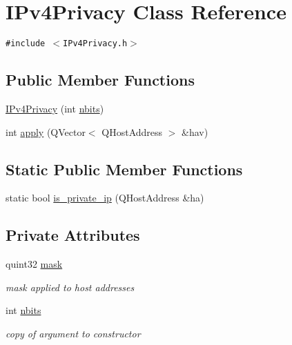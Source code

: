 \hypertarget{classIPv4Privacy}{
\section{IPv4Privacy Class Reference}
\label{classIPv4Privacy}
}
{\tt \#include $<$IPv4Privacy.h$>$}

\subsection*{Public Member Functions}
\begin{CompactItemize}
\item 
\hyperlink{classIPv4Privacy_1527628365ad50b068b9fa27159b7ce6}{IPv4Privacy} (int \hyperlink{classIPv4Privacy_3a100b3960950f7732334e3aa3723dc9}{nbits})
\item 
int \hyperlink{classIPv4Privacy_253fc1c2a4ab5cf12814cbb04a18f6ec}{apply} (QVector$<$ QHostAddress $>$ \&hav)
\end{CompactItemize}
\subsection*{Static Public Member Functions}
\begin{CompactItemize}
\item 
static bool \hyperlink{classIPv4Privacy_cb5f59d88c60a6dc64a3c73ae9f4bcd2}{is\_\-private\_\-ip} (QHostAddress \&ha)
\end{CompactItemize}
\subsection*{Private Attributes}
\begin{CompactItemize}
\item 
\hypertarget{classIPv4Privacy_47d8e232d1587daeafab8bfb7dc052ea}{
quint32 \hyperlink{classIPv4Privacy_47d8e232d1587daeafab8bfb7dc052ea}{mask}}
\label{classIPv4Privacy_47d8e232d1587daeafab8bfb7dc052ea}

\begin{CompactList}\small\item\em mask applied to host addresses \item\end{CompactList}\item 
\hypertarget{classIPv4Privacy_3a100b3960950f7732334e3aa3723dc9}{
int \hyperlink{classIPv4Privacy_3a100b3960950f7732334e3aa3723dc9}{nbits}}
\label{classIPv4Privacy_3a100b3960950f7732334e3aa3723dc9}

\begin{CompactList}\small\item\em copy of argument to constructor \item\end{CompactList}\end{CompactItemize}
